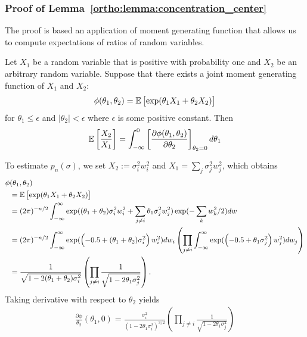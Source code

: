  \subsubsection*{Proof of Lemma~\ref{ortho:lemma:concentration_center}}
 The proof is based an application of moment generating function that allows us to compute expectations of ratios of random variables. 
 \begin{lemma}
 Let $X_1$ be a random variable that is positive with probability one and $X_2$  be an arbitrary random variable. Suppose that there exists a joint moment generating function of $X_1$ and $X_2$: 
 \begin{align*}
     \phi(\theta_1,\theta_2) = \mathbb{E} \left[ \exp(\theta_1 X_1 + \theta_2 X_2) \right]
 \end{align*}
 for $ \theta_1 \leq \epsilon$ and $| \theta_2 | <\epsilon$ where $\epsilon$ is some positive constant. Then 
 \begin{align*}
     \mathbb{E} \left[ \frac{X_2}{X_1}\right] = \int_{-\infty}^0 \left[\frac{\partial \phi(\theta_1,\theta_2)}{\partial \theta_2} \right]_{\theta_2 = 0 } d \theta_1 
 \end{align*}
 \end{lemma}
 \noindent To estimate $p_n(\sigma)$, we set $X_2 := \sigma_i^2 w_i^2$ and $X_1 = \sum_{j} \sigma_j^2 w_j^2 $, which obtains 
 \begin{align*}
     \phi&(\theta_1,\theta_2) \\
     & = \mathbb{E} \left[ \exp(\theta_1 X_1 + \theta_2 X_2) \right] \nonumber\\ 
     & = (2\pi)^{-n/2}\int_{-\infty}^{\infty}\exp( (\theta_1 + \theta_2) \sigma_i^2 w_i^2 + \sum_{j\neq i} \theta_1 \sigma_j^2 w_j^2) \exp(-\sum_{k} w_k^2/2) d w \\ 
     & = (2\pi)^{-n/2}\int_{-\infty}^{\infty} \exp(\left(-0.5+(\theta_1+\theta_2) \sigma_i^2\right) w_i^2) d w_i  \left(\prod_{j\neq i} \int_{-\infty}^{\infty} \exp(\left(-0.5+\theta_1 \sigma_j^2\right) w_j^2) d w_j\right)\\ 
     & = \frac{1}{\sqrt{1-2 (\theta_1 +  \theta_2)\sigma_i^2}} \left( \prod_{j\neq i} \frac{1}{\sqrt{1-2\theta_1 \sigma_j^2}} \right).
 \end{align*}
 Taking derivative with respect to $\theta_2$ yields 
 \begin{align*}
     \frac{\partial \phi}{\theta_2}(\theta_1,0) = \frac{\sigma_i^2}{(1-2 \theta_1\sigma_i^2)^{3/2}}\left( \prod_{j\neq i} \frac{1}{\sqrt{1-2\theta_1 \sigma_j^2}} \right)
 \end{align*}
